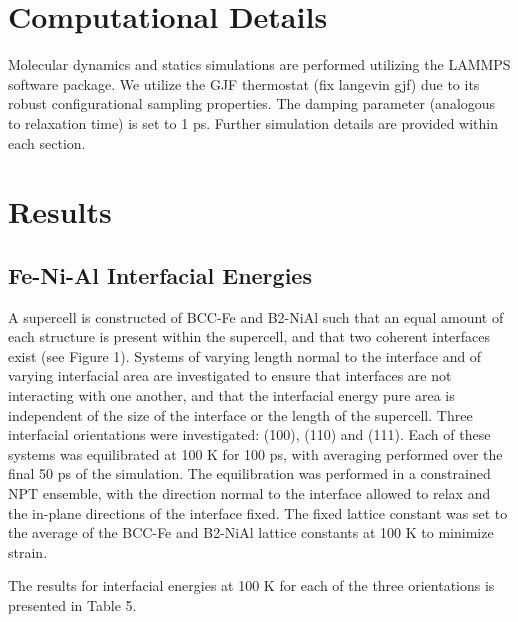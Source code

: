 \documentclass[review]{elsarticle}
\begin{document}

\section{Computational Details}
Molecular dynamics and statics simulations are performed utilizing the LAMMPS \cite{plimpton1995} software package.  We utilize the GJF thermostat \cite{gjf2013, gjf2014} (fix langevin gjf) due to its robust configurational sampling properties.  The damping parameter (analogous to relaxation time) is set to 1 ps.  Further simulation details are provided within each section.

\section{Results}
\subsection{Fe-Ni-Al Interfacial Energies}
A supercell is constructed of BCC-Fe and B2-NiAl such that an equal amount of each structure is present within the supercell, and that two coherent interfaces exist (see Figure 1).  Systems of varying length normal to the interface and of varying interfacial area are investigated to ensure that interfaces are not interacting with one another, and that the interfacial energy pure area is independent of the size of the interface or the length of the supercell.  Three interfacial orientations were investigated: (100), (110) and (111).  Each of these systems was equilibrated at 100 K for 100 ps, with averaging performed over the final 50 ps of the simulation.  The equilibration was performed in a constrained NPT ensemble, with the direction normal to the interface allowed to relax and the in-plane directions of the interface fixed.  The fixed lattice constant was set to the average of the BCC-Fe and B2-NiAl lattice constants at 100 K to minimize strain.  

The results for interfacial energies at 100 K for each of the three orientations is presented in Table 5.
\end{document}
